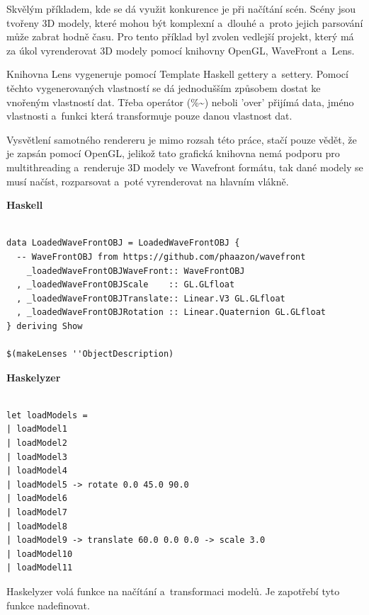 \documentclass[male, czech]{kithesis}
\begin{document}
Skvělým příkladem, kde se dá využit konkurence je při načítání 
scén. Scény jsou tvořeny 3D modely, které mohou být komplexní
a~dlouhé a~proto jejich parsování může zabrat hodně času. Pro 
tento příklad byl zvolen vedlejší projekt, který má za úkol 
vyrenderovat 3D modely pomocí knihovny OpenGL, WaveFront a~Lens. 

Knihovna Lens vygeneruje pomocí Template Haskell gettery a~settery.
Pomocí těchto vygenerovaných vlastností se dá jednodušším způsobem 
dostat ke vnořeným vlastností dat. 
Třeba operátor (\%\textasciitilde) neboli 'over' přijímá data,
jméno vlastnosti
a~funkci která transformuje pouze danou vlastnost dat.

Vysvětlení samotného rendereru je mimo rozsah této práce, stačí 
pouze vědět, že je zapsán pomocí OpenGL, jelikož tato grafická 
knihovna nemá podporu pro multithreading a~renderuje 
3D modely ve Wavefront formátu, 
tak dané modely se musí načíst,
rozparsovat
a~poté vyrenderovat na hlavním vlákně.

\newpage

\textbf{Haskell}
\begin{verbatim}

data LoadedWaveFrontOBJ = LoadedWaveFrontOBJ {
  -- WaveFrontOBJ from https://github.com/phaazon/wavefront
    _loadedWaveFrontOBJWaveFront:: WaveFrontOBJ
  , _loadedWaveFrontOBJScale    :: GL.GLfloat
  , _loadedWaveFrontOBJTranslate:: Linear.V3 GL.GLfloat
  , _loadedWaveFrontOBJRotation :: Linear.Quaternion GL.GLfloat
} deriving Show

$(makeLenses ''ObjectDescription)

\end{verbatim}

\textbf{Haskelyzer}
\begin{verbatim}

let loadModels = 
| loadModel1 
| loadModel2 
| loadModel3 
| loadModel4 
| loadModel5 -> rotate 0.0 45.0 90.0
| loadModel6 
| loadModel7 
| loadModel8 
| loadModel9 -> translate 60.0 0.0 0.0 -> scale 3.0
| loadModel10 
| loadModel11 

\end{verbatim}

Haskelyzer volá funkce na načítání a~transformaci modelů.
Je zapotřebí tyto funkce nadefinovat.
\end{document}
